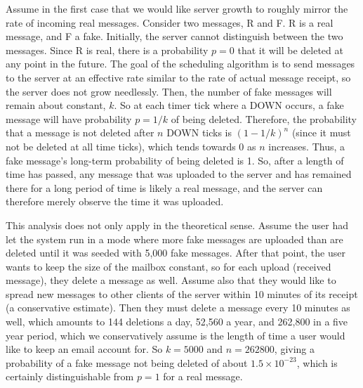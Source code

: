\documentclass[pageno]{jpaper}
\begin{document}
Assume in the first case that we would like server growth to roughly mirror the rate of incoming real messages. Consider two messages, R and F. R is a real message, and F a fake. Initially, the server cannot distinguish between the two messages. Since R is real, there is a probability $p=0$ that it will be deleted at any point in the future. The goal of the scheduling algorithm is to send messages to the server at an effective rate similar to the rate of actual message receipt, so the server does not grow needlessly. Then, the number of fake messages will remain about constant, $k$. So at each timer tick where a DOWN occurs, a fake message will have probability $p=1/k$ of being deleted. Therefore, the probability that a message is not deleted after $n$ DOWN ticks is $(1-1/k)^n$ (since it must not be deleted at all time ticks), which tends towards 0 as $n$ increases. Thus, a fake message's long-term probability of being deleted is 1. So, after a length of time has passed, any message that was uploaded to the server and has remained there for a long period of time is likely a real message, and the server can therefore merely observe the time it was uploaded.

This analysis does not only apply in the theoretical sense. Assume the user had let the system run in a mode where more fake messages are uploaded than are deleted until it was seeded with 5,000 fake messages. After that point, the user wants to keep the size of the mailbox constant, so for each upload (received message), they delete a message as well. Assume also that they would like to spread new messages to other clients of the server within 10 minutes of its receipt (a conservative estimate). Then they must delete a message every 10 minutes as well, which amounts to 144 deletions a day, 52,560 a year, and 262,800 in a five year period, which we conservatively assume is the length of time a user would like to keep an email account for. So $k=5000$ and $n=262800$, giving a probability of a fake message not being deleted of about $1.5\times10^{-23}$, which is certainly distinguishable from $p=1$ for a real message.
\end{document}

